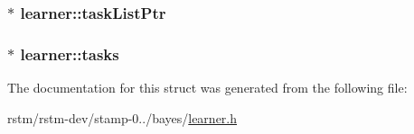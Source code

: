 \hypertarget{structlearner_a1ed62740e14c9ecc3053cf2db0add5e0}{
\subsubsection[{task\-List\-Ptr}]{$\ast$ learner\-::task\-List\-Ptr}}\label{structlearner_a1ed62740e14c9ecc3053cf2db0add5e0}
\hypertarget{structlearner_ae671bea416918ec6c31c076caa2425b5}{
\subsubsection[{tasks}]{$\ast$ learner\-::tasks}}\label{structlearner_ae671bea416918ec6c31c076caa2425b5}


The documentation for this struct was generated from the following file\-:\begin{DoxyCompactItemize}
\item 
rstm/rstm-\/dev/stamp-\/0../bayes/\hyperlink{learner_8h}{learner.\-h}\end{DoxyCompactItemize}
